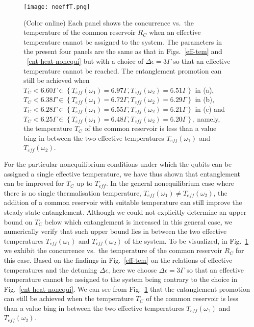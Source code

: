 \documentclass[12pt]{iopart}
\begin{document}
\begin{figure}[tbp]
\begin{center}
{\texttt{[image: noeffT.png]}
}
\end{center}
\caption{(Color online) Each panel shows the concurrence vs.~the temperature of the common reservoir $R_C$ when an effective temperature cannot be assigned to the system. The parameters in the present four panels are the same as that in Figs.~\ref{eff-tem} and ~\ref{ent-heat-nonequi} but with a choice of $\Delta\epsilon=3\Gamma$ so that an effective temperature cannot be reached. The entanglement promotion can still be achieved when $T_{C}<6.60\Gamma\in\left\{T_{eff} (\omega_1)=6.97\Gamma,T_{eff} (\omega_2)=6.51\Gamma\right\}$ in (a), $T_{C}<6.38\Gamma\in\left\{T_{eff} (\omega_1)=6.72\Gamma,T_{eff} (\omega_2)=6.29\Gamma\right\}$ in (b), $T_{C}<6.28\Gamma\in\left\{T_{eff} (\omega_1)=6.55\Gamma,T_{eff} (\omega_2)=6.21\Gamma\right\}$ in (c) and $T_{C}<6.25\Gamma\in\left\{T_{eff} (\omega_1)=6.48\Gamma,T_{eff} (\omega_2)=6.20\Gamma\right\}$, namely, the temperature $T_{C}$ of the common reservoir is less than a value bing in between the two effective temperatures $T_{eff} (\omega_1)$ and $T_{eff} (\omega_2)$. }
\label{noeffT}
\end{figure}

For the particular nonequilibrium conditions under which the qubits can be assigned a single effective temperature, we have thus shown that entanglement can be improved for $T_{C}$ up to $T_{eff}$. In the general nonequilibrium case where there is no single thermalisation temperature, $T_{eff}(\omega_{1})\neq T_{eff}(\omega_{2})$, the addition of a common reservoir with suitable temperature can still improve the steady-state entanglement. Although we could not explicitly determine an upper bound on $T_C$ below which entanglement is increased in this general case, we numerically verify that such upper bound lies in between the two effective temperatures $T_{eff}(\omega_{1})$ and $T_{eff}(\omega_{2})$ of the system. To be visualized, in Fig.~\ref{noeffT} we exhibit the concurrence vs.~the temperature of the common reservoir $R_C$ for this case. Based on the findings in Fig.~\ref{eff-tem} on the relations of effective temperatures and the detuning $\Delta\epsilon$, here we choose $\Delta\epsilon=3\Gamma$ so that an effective temperature cannot be assigned to the system being contrary to the choice in Fig.~\ref{ent-heat-nonequi}. We can see from Fig.~\ref{noeffT} that the entanglement promotion can still be achieved when the temperature $T_{C}$ of the common reservoir is less than a value bing in between the two effective temperatures $T_{eff} (\omega_1)$ and $T_{eff} (\omega_2)$.
\end{document}

